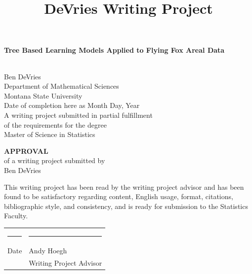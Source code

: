 \documentclass[
  12pt,
  letterpaper,
  DIV=11,
  numbers=noendperiod]{scrartcl}
\title{DeVries Writing Project}
\author{}
\date{}
\newcommand{\myname}{Ben DeVries}
\newcommand{\myadvisor}{Andy Hoegh}
\newcommand{\maintitle}{Tree Based Learning Models Applied to Flying Fox Areal Data}
\newcommand{\mydate}{Date of completion here as Month Day, Year}
\begin{document}
\maketitle

\begin{singlespace}

\begin{titlepage}
\null
\vspace{2.in}
\begin{center}
{\LARGE\bfseries \maintitle} \vspace{.1in}

\vspace{.05in}
{\LARGE\bfseries $\;$} \\ [.5in]
{\Large  \myname \\
\vspace{0.5cm}
Department of Mathematical Sciences \\
Montana State University \\ [.5in]}
\mydate \\ [1.in]
A writing project submitted in partial fulfillment\\
of the requirements for the degree\\[.25in]
Master of Science in Statistics
\end{center}
\end{titlepage}

\begin{titlepage}
\null
\vspace{2.in}
\begin{center}
{\bfseries\huge APPROVAL}\\[1.in]
of a writing project submitted by\\[.25in]
\myname \\[1.in]
\end{center}
\noindent
This writing project has been read by the writing project advisor and
has been found to be satisfactory regarding content, English usage,
format, citations, bibliographic style, and consistency, and is ready
for submission to the Statistics Faculty.

\vspace{.3in}
\begin{center}
\begin{tabular}{ll}
\rule{2.75in}{.03in} & \rule{2.75in}{.03in} \\
Date& \myadvisor \\
& Writing Project Advisor \\
\end{tabular}
\end{center}


\end{titlepage}
\end{singlespace}
\end{document}
